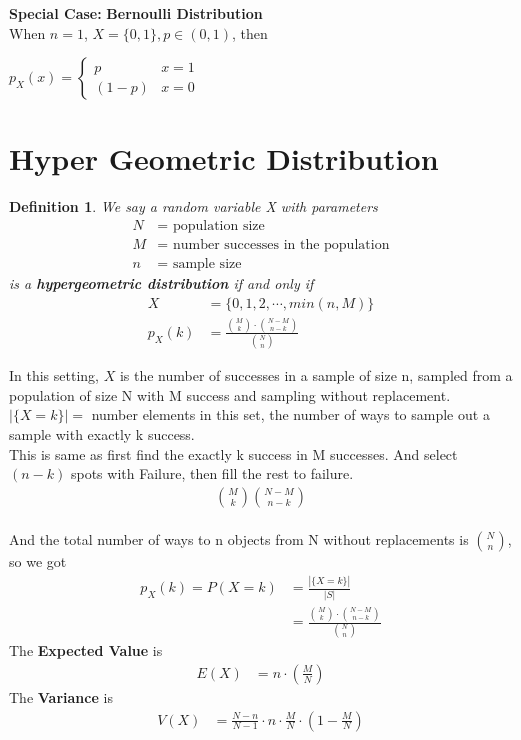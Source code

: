\documentclass[11pt,oneside]{book}
\theoremstyle{break}
\theoremstyle{break}
\newtheorem{defn}{Definition}[corL]
\begin{document}
\color{Red}\textbf{Special Case:} \textbf{Bernoulli Distribution}\\
\color{black}When $n=1$, $X=\{0,1\}, p\in(0,1)$, then \begin{center}
$p_X(x)=\begin{cases}p &x=1\\ (1-p)&x=0 
\end{cases}$
\end{center}
\section[Hyper Geometric Distribution]{Hyper Geometric Distribution}
\begin{defn}
We say a random variable X with parameters \begin{align*}
N&=\text{ population size}\\
M&=\text{ number successes in the population}\\
n&=\text{ sample size}
\end{align*}
is a \textbf{hypergeometric distribution} if and only if \begin{align*}
X&=\{0,1,2,\cdots,min(n,M)\}\\
p_X(k)&=\frac{\binom Mk \cdot \binom{N-M}{n-k}}{\binom{N}{n}}
\end{align*}
\end{defn}
In this setting, $X$ is the number of successes in a sample of size n, sampled from a population of size N with M success and sampling without replacement.\\
$|\{X=k\}|=$ number elements in this set, the number of ways to sample out a sample with exactly k success.\\
 This is same as first find the exactly k success in M successes. And select $(n-k)$ spots with Failure, then fill the rest to failure.\begin{align*}
 \binom Mk \binom{N-M}{n-k}
 \end{align*}
\hfill\\
And the total number of ways to n objects from N without replacements is $\binom Nn$, so we got \begin{align*}
p_X(k)=P(X=k)&=\frac{|\{X=k\}|}{|S|}\\
&=\frac{\binom Mk \cdot \binom{N-M}{n-k}}{\binom{N}{n}}
\end{align*}
The \textbf{Expected Value} is\begin{align*}
E(X)&=n\cdot \left( \frac{M}{N}\right)
\end{align*}
The \textbf{Variance }is \begin{align*}
V(X)&=\frac{N-n}{N-1}\cdot n \cdot \frac{M}{N}\cdot \left( 1-\frac{M}{N}\right)
\end{align*}
\end{document}
